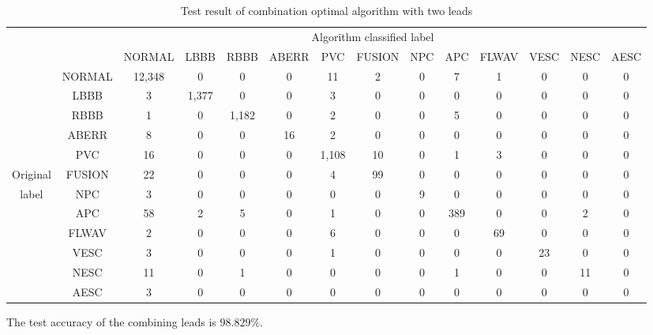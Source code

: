 \documentclass{bmcart}
\begin{document}
\begin{table}[]
\small
\begin{center}
\begin{threeparttable}
\caption{Test result of combination optimal algorithm with two leads}
\label{table4}
\begin{tabular}{cccccccccccccc}
\hline
\multicolumn{9}{r}{Algorithm classified label} \\
\cline{3-14}
		 &      & NORMAL & LBBB & RBBB & ABERR & PVC & FUSION & NPC & APC & FLWAV & VESC & NESC & AESC\\
\hline
 		 & NORMAL & 12,348& 0   &  0   &  0   &  11  &  2    &	0   &  7  &   1   &   0  &  0  &  0 \\
	     & LBBB   &  3    & 1,377&  0  &  0   &  3   &  0    &  0   &  0  &   0   &   0  &  0  &  0 \\
		 & RBBB   &  1    &  0  & 1,182&  0   &  2   &  0    &	0   &  5  &   0   &   0  &  0  &  0 \\
		 & ABERR  &  8    &  0  &  0   &  16  &  2   &  0    &	0   &  0  &   0   &   0  &  0  &  0 \\
		 & PVC    &  16   &  0  &  0   &  0   & 1,108&  10   &	0   &  1  &   3   &   0  &  0  &  0 \\
Original & FUSION &	 22   &  0  &  0   &  0   &  4   &   99  &	0   &  0  &   0   &   0  &  0  &  0 \\
label    & NPC    &	 3    &  0  &  0   &  0   &  0   &  0    &	9   &  0  &   0   &   0  &  0  &  0 \\
		 & APC    &	 58   &  2  &  5   &  0   &  1   &  0    &	0   &  389&   0   &   0  &  2  &  0 \\
		 & FLWAV  &	 2    &  0  &  0   &  0   &  6   &  0    &	0   &  0  &   69  &   0  &  0  &  0 \\
		 & VESC   &	 3    &  0  &  0   &  0   &  1   &  0    &	0   &  0  &   0   &  23  &  0  &  0 \\
		 & NESC   &	 11   &  0  &  1   &  0   &  0   &  0    &	0   &  1  &   0   &   0  &  11 &  0 \\
		 & AESC   &	 3    &  0  &  0   &  0   &  0   &  0    &	0   &  0  &   0   &   0  &  0  &  0 \\
\hline
\end{tabular}
\begin{tablenotes}
\item The test accuracy of the combining leads is $98.829\%$.
\end{tablenotes}
\end{threeparttable}
\end{center}
\end{table}
\end{document}
